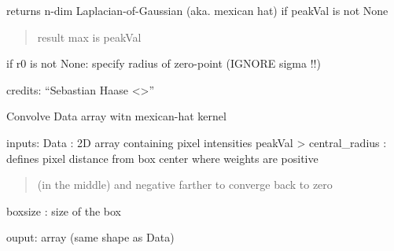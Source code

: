 \documentclass[letterpaper,10pt,english]{sphinxmanual}
\begin{document}

\begin{fulllineitems}
\label{\detokenize{PeakSearch:LaueTools.readmccd.LoGArr}}
returns n-dim Laplacian-of-Gaussian (aka. mexican hat)
if peakVal   is not None
\begin{quote}

result max is peakVal
\end{quote}

if r0 is not None: specify radius of zero-point (IGNORE sigma !!)

credits: “Sebastian Haase \textless{}\textgreater{}”

\end{fulllineitems}


\begin{fulllineitems}
\label{\detokenize{PeakSearch:LaueTools.readmccd.ConvolvebyKernel}}
Convolve Data array witn mexican-hat kernel

inputs:
Data                            : 2D array containing pixel intensities
peakVal \textgreater{} central\_radius        : defines pixel distance from box center where weights are positive
\begin{quote}

(in the middle) and negative farther to converge back to zero
\end{quote}

boxsize                            : size of the box

ouput:
array  (same shape as Data)

\end{fulllineitems}

\end{document}
